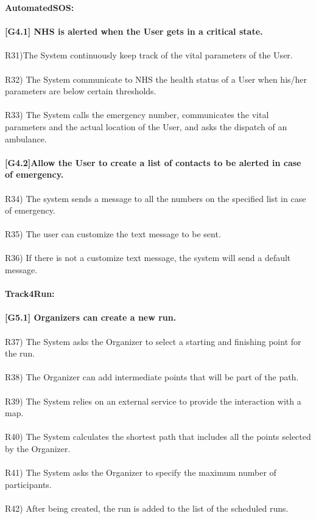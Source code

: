 \textbf{AutomatedSOS:} \\ \\ 
\textbf{[G4.1] NHS is alerted when the User gets in a critical state.} \\ \\
R31)The System continuously keep track of the vital parameters of the User. \\ \\
R32) The System communicate to NHS the health status of a User when his/her parameters are below certain thresholds. \\ \\
R33) The System calls the emergency number, communicates the vital parameters and the actual location of the User, and asks the dispatch of an ambulance. \\ \\

\textbf{[G4.2]Allow the User to create a list of contacts to be alerted in case of emergency.} \\ \\
R34) The system sends a message to all the numbers on the specified list in case of emergency. \\ \\
R35) The user can customize the  text message to be sent. \\ \\
R36) If there is not a customize text message, the system will send a default message. \\ \\

\textbf{Track4Run:}\\ \\
\textbf{[G5.1] Organizers can create a new run.} \\ \\
R37) The System asks the Organizer to select a starting and finishing point for the run. \\ \\
R38) The Organizer can add intermediate points that will be part of the path. \\ \\
R39) The System relies on an external service to provide the interaction with a map. \\ \\
R40) The System calculates the shortest path that includes all the points selected by the Organizer. \\ \\   
R41) The System asks the Organizer to specify the maximum number of participants. \\ \\
R42) After being created, the run is added to the list of the scheduled runs. \\ \\

